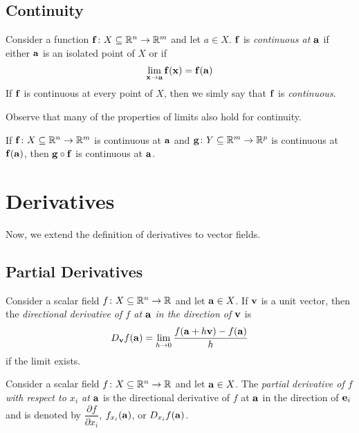 \documentclass{article}
\begin{document}
\subsection{Continuity}

\begin{definition}[Continuity]
  Consider a function $\mathbf{f} \colon X \subseteq \mathbb{R}^n \to \mathbb{R}^m$ and let $a \in X$.
  $\mathbf{f}$ is \emph{continuous at $\mathbf{a}$} if either $\mathbf{a}$ is an isolated point of $X$ or if
  \begin{align}
    \lim_{\mathbf{x} \to \mathbf{a}} \mathbf{f}(\mathbf{x}) = \mathbf{f}(\mathbf{a})
  \end{align}
  If $\mathbf{f}$ is continuous at every point of $X$, then we simly say that $\mathbf{f}$ is \emph{continuous}.
\end{definition}
Observe that many of the properties of limits also hold for continuity.

\begin{theorem}
  If $\mathbf{f} \colon X \subseteq \mathbb{R}^n \to \mathbb{R}^m$ is continuous at $\mathbf{a}$ and $\mathbf{g} \colon Y \subseteq \mathbb{R}^m \to \mathbb{R}^p$ is continuous at $\mathbf{f}(\mathbf{a})$, then $\mathbf{g} \circ \mathbf{f}$ is continuous at $\mathbf{a}$.
\end{theorem}

\section{Derivatives}

Now, we extend the definition of derivatives to vector fields.

\subsection{Partial Derivatives}

\begin{definition}
  Consider a scalar field $f \colon X \subseteq \mathbb{R}^n \to \mathbb{R}$ and let $\mathbf{a} \in X$.
  If $\mathbf{v}$ is a unit vector, then the \emph{directional derivative of $f$ at $\mathbf{a}$ in the direction of $\mathbf{v}$} is
  \begin{align}
    D_{\mathbf{v}}f(\mathbf{a}) = \lim_{h \to 0} \frac{f(\mathbf{a} + h\mathbf{v}) - f(\mathbf{a})}{h}
  \end{align}
  if the limit exists.
\end{definition}

\begin{definition}
  Consider a scalar field $f \colon X \subseteq \mathbb{R}^n \to \mathbb{R}$ and let $\mathbf{a} \in X$.
  The \emph{partial derivative of $f$ with respect to $x_i$ at $\mathbf{a}$} is
  the directional derivative of $f$ at $\mathbf{a}$ in the direction of $\mathbf{e}_i$ and is denoted by $\dfrac{\partial f}{\partial x_i}$, $f_{x_i}(\mathbf{a})$, or $D_{x_i}f(\mathbf{a})$.
\end{definition}
\end{document}
